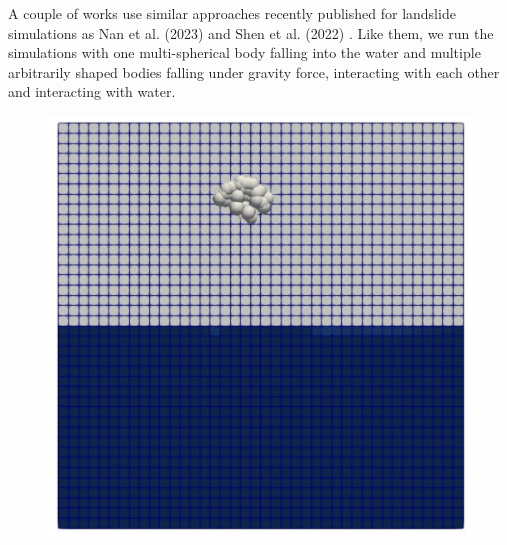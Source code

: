A couple of works use similar approaches recently published for landslide simulations as Nan et al. (2023) \cite{nan2023high} and Shen et al. (2022) \cite{shen2022resolved}.
Like them, we run the simulations with one multi-spherical body falling into the water and multiple arbitrarily shaped bodies falling under gravity force, interacting with each other and interacting with water.


\begin{figure}[H]
    \centering
    \begin{minipage}{.5\textwidth}
        \centering
        \includegraphics[width=\linewidth]{Images/chap4/clump_1.png}
    \end{minipage}%
    \begin{minipage}{.5\textwidth}
        \centering

\end{minipage}
\end{figure}

